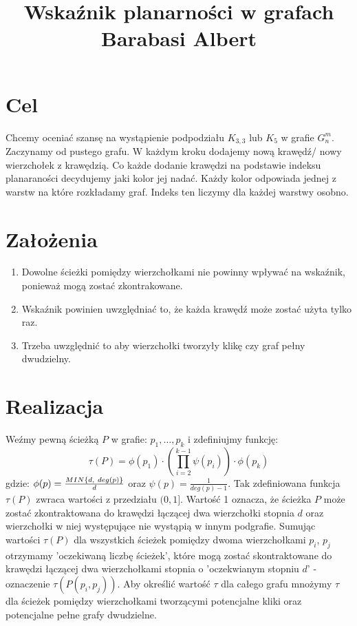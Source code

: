 \documentclass{article}
\title{ Wskaźnik planarności w grafach Barabasi Albert }
\author{}
\date{}
\begin{document}
\maketitle

\section{Cel}
Chcemy oceniać szansę na wystąpienie podpodziału $K_{3,3}$ lub $K_5$ w grafie $G^m_n$.
Zaczynamy od pustego grafu. W każdym kroku dodajemy nową krawędź/ nowy wierzchołek z krawędzią.
Co każde dodanie krawędzi na podstawie indeksu planaraności decydujemy jaki kolor jej nadać. Każdy kolor odpowiada jednej z warstw na które rozkładamy graf.
Indeks ten liczymy dla każdej warstwy osobno.

\section{Założenia}
\begin{enumerate}
    \item Dowolne ścieżki pomiędzy wierzchołkami nie powinny wpływać na wskaźnik, ponieważ mogą zostać zkontrakowane.
    \item Wskaźnik powinien uwzględniać to, że każda krawędź może zostać użyta tylko raz.
    \item Trzeba uwzględnić to aby wierzchołki tworzyły klikę czy graf pełny dwudzielny.
\end{enumerate}

\section{Realizacja}
Weźmy pewną ścieżką $P$ w grafie: $p_1, \ldots, p_k$ i zdefiniujmy funkcję:
\begin{dmath}
    \tau(P) = \phi(p_1) \cdot (\prod_{i=2}^{k-1} \psi(p_i)) \cdot \phi(p_k)
\end{dmath}
gdzie: $\phi(p) = \frac{MIN\{d, \\\ deg(p)\}}{d}$ oraz $\psi(p) = \frac{1}{deg(p) - 1}$.
\newline
Tak zdefiniowana funkcja $\tau(P)$ zwraca wartości z przedziału $(0, 1]$. Wartość 1 oznacza, że ścieżka $P$ może zostać zkontraktowana do krawędzi łączącej dwa wierzchołki stopnia $d$ oraz wierzchołki w niej występujące nie wystąpią w innym podgrafie.
\newline
Sumując wartości $\tau(P)$ dla wszystkich ścieżek pomiędzy dwoma wierzchołkami $p_i$, $p_j$ otrzymamy 'oczekiwaną liczbę ścieżek', które mogą zostać skontraktowane do krawędzi łączącej dwa wierzchołkami stopnia o 'oczekwianym stopniu $d$' - oznaczenie $\tau(P(p_i, p_j))$.
\newline
Aby określić wartość $\tau$ dla całego grafu mnożymy $\tau$ dla ścieżek pomiędzy wierzchołkami tworzącymi potencjalne kliki oraz potencjalne pełne grafy dwudzielne.
\end{document}
